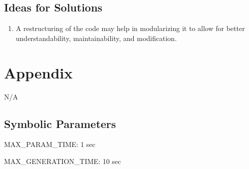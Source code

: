 \documentclass[12pt, titlepage]{article}
\begin{document}
\subsection{Ideas for Solutions}

\begin{enumerate}[start=1,label={Issue \arabic*.}]
    \item A restructuring of the code may help in modularizing it to allow for better understandability, maintainability, and modification.
\end{enumerate}





\newpage

\section{Appendix}

N/A

\subsection{Symbolic Parameters}

\noindent MAX\_PARAM\_TIME: 1 sec

\noindent MAX\_GENERATION\_TIME: 10 sec
\end{document}
